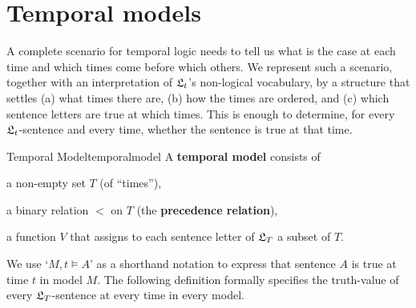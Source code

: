 \section{Temporal models}

A complete scenario for temporal logic needs to tell us what is the case at each
time and which times come before which others. We represent such a scenario,
together with an interpretation of $\mathfrak{L}_{t}$'s non-logical vocabulary, by a
structure that settles (a) what times there are, (b) how the times are ordered,
and (c) which sentence letters are true at which times. This is enough to
determine, for every $\mathfrak{L}_{t}$-sentence and every time, whether the sentence is
true at that time.

\begin{definition}{Temporal Model}{temporalmodel}
  A \textbf{temporal model} consists of
  \vspace{-3mm}
  \begin{itemize*}
  \item a non-empty set $T$ (of ``times''),
  \item a binary relation $<$ on $T$ (the \textbf{precedence relation}),
  \item a function $V$ that assigns to each sentence letter of $\mathfrak{L}_T$
    a subset of $T$.
  \end{itemize*}
\end{definition}


We use `$M, t \models A$' as a shorthand notation to express that sentence $A$
is true at time $t$ in model $M$. The following definition formally specifies
the truth-value of every $\mathfrak{L}_T$-sentence at every time in every model.


